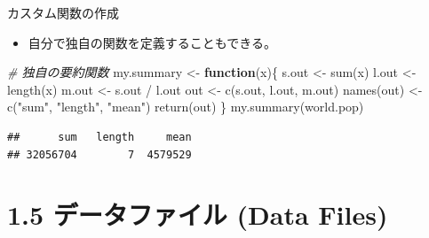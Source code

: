 \documentclass[
  ignorenonframetext,
]{beamer}
\newenvironment{Shaded}{\begin{snugshade}}{\end{snugshade}}
\newcommand{\CommentTok}[1]{\textcolor[rgb]{0.56,0.35,0.01}{\textit{#1}}}
\newcommand{\ControlFlowTok}[1]{\textcolor[rgb]{0.13,0.29,0.53}{\textbf{#1}}}
\newcommand{\FunctionTok}[1]{\textcolor[rgb]{0.00,0.00,0.00}{#1}}
\newcommand{\NormalTok}[1]{#1}
\newcommand{\OtherTok}[1]{\textcolor[rgb]{0.56,0.35,0.01}{#1}}
\newcommand{\SpecialCharTok}[1]{\textcolor[rgb]{0.00,0.00,0.00}{#1}}
\newcommand{\StringTok}[1]{\textcolor[rgb]{0.31,0.60,0.02}{#1}}
\providecommand{\tightlist}{%
  \setlength{\itemsep}{0pt}\setlength{\parskip}{0pt}}
\begin{document}
\begin{frame}[fragile]{カスタム関数の作成}
\protect\hypertarget{ux30abux30b9ux30bfux30e0ux95a2ux6570ux306eux4f5cux6210}{}
\begin{itemize}
\tightlist
\item
  自分で独自の関数を定義することもできる。
\end{itemize}

\begin{Shaded}
\begin{Highlighting}[]
\CommentTok{\# 独自の要約関数}
\NormalTok{my.summary }\OtherTok{\textless{}{-}} \ControlFlowTok{function}\NormalTok{(x)\{ }
\NormalTok{  s.out }\OtherTok{\textless{}{-}} \FunctionTok{sum}\NormalTok{(x)}
\NormalTok{  l.out }\OtherTok{\textless{}{-}} \FunctionTok{length}\NormalTok{(x)}
\NormalTok{  m.out }\OtherTok{\textless{}{-}}\NormalTok{ s.out }\SpecialCharTok{/}\NormalTok{ l.out}
\NormalTok{  out }\OtherTok{\textless{}{-}} \FunctionTok{c}\NormalTok{(s.out, l.out, m.out)}
  \FunctionTok{names}\NormalTok{(out) }\OtherTok{\textless{}{-}} \FunctionTok{c}\NormalTok{(}\StringTok{"sum"}\NormalTok{, }\StringTok{"length"}\NormalTok{, }\StringTok{"mean"}\NormalTok{)}
  \FunctionTok{return}\NormalTok{(out)}
\NormalTok{\}}
\FunctionTok{my.summary}\NormalTok{(world.pop)}
\end{Highlighting}
\end{Shaded}

\begin{verbatim}
##      sum   length     mean 
## 32056704        7  4579529
\end{verbatim}
\end{frame}

\hypertarget{ux30c7ux30fcux30bfux30d5ux30a1ux30a4ux30eb-data-files}{%
\section{1.5 データファイル (Data
Files)}\label{ux30c7ux30fcux30bfux30d5ux30a1ux30a4ux30eb-data-files}}
\end{document}
